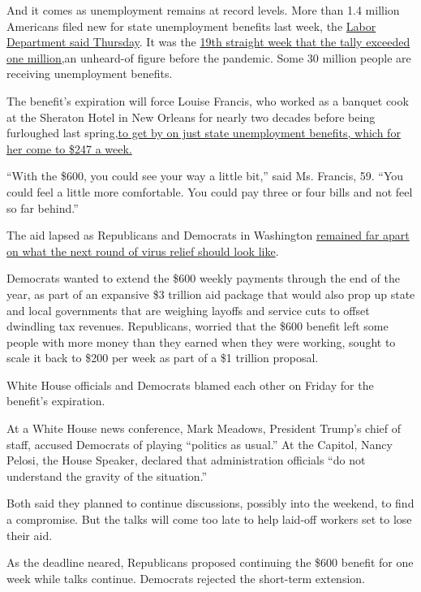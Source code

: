 And it comes as unemployment remains at record levels. More than 1.4
million Americans filed new for state unemployment benefits last week,
the \href{https://oui.doleta.gov/press/2020/073020.pdf}{Labor Department
said Thursday}. It was the
\href{https://www.nytimes.com/2020/07/30/business/economy/q2-gdp-coronavirus-economy.html}{19th
straight week that the tally exceeded one million,}an unheard-of figure
before the pandemic. Some 30 million people are receiving unemployment
benefits.

The benefit's expiration will force Louise Francis, who worked as a
banquet cook at the Sheraton Hotel in New Orleans for nearly two decades
before being furloughed last
spring,\href{https://www.nytimes.com/2020/07/30/business/economy/q2-gdp-coronavirus-economy.html}{to
get by on just state unemployment benefits, which for her come to \$247
a week.}

``With the \$600, you could see your way a little bit,'' said Ms.
Francis, 59. ``You could feel a little more comfortable. You could pay
three or four bills and not feel so far behind.''

The aid lapsed as Republicans and Democrats in Washington
\href{https://www.nytimes.com/2020/07/28/us/politics/coronavirus-relief-bills-house-senate.html}{remained
far apart on what the next round of virus relief should look like}.

Democrats wanted to extend the \$600 weekly payments through the end of
the year, as part of an expansive \$3 trillion aid package that would
also prop up state and local governments that are weighing layoffs and
service cuts to offset dwindling tax revenues. Republicans, worried that
the \$600 benefit left some people with more money than they earned when
they were working, sought to scale it back to \$200 per week as part of
a \$1 trillion proposal.

White House officials and Democrats blamed each other on Friday for the
benefit's expiration.

At a White House news conference, Mark Meadows, President Trump's chief
of staff, accused Democrats of playing ``politics as usual.'' At the
Capitol, Nancy Pelosi, the House Speaker, declared that administration
officials ``do not understand the gravity of the situation.''

Both said they planned to continue discussions, possibly into the
weekend, to find a compromise. But the talks will come too late to help
laid-off workers set to lose their aid.

As the deadline neared, Republicans proposed continuing the \$600
benefit for one week while talks continue. Democrats rejected the
short-term extension.

